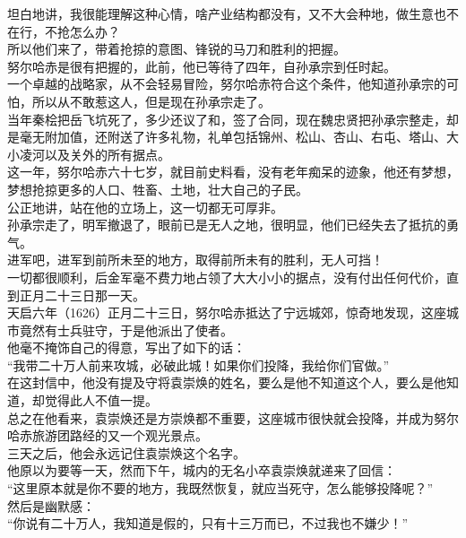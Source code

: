 \begin{multicols}{\theparacolNo}
坦白地讲，我很能理解这种心情，啥产业结构都没有，又不大会种地，做生意也不在行，不抢怎么办？\\

所以他们来了，带着抢掠的意图、锋锐的马刀和胜利的把握。\\

努尔哈赤是很有把握的，此前，他已等待了四年，自孙承宗到任时起。\\

一个卓越的战略家，从不会轻易冒险，努尔哈赤符合这个条件，他知道孙承宗的可怕，所以从不敢惹这人，但是现在孙承宗走了。\\

当年秦桧把岳飞坑死了，多少还议了和，签了合同，现在魏忠贤把孙承宗整走，却是毫无附加值，还附送了许多礼物，礼单包括锦州、松山、杏山、右屯、塔山、大小凌河以及关外的所有据点。\\

这一年，努尔哈赤六十七岁，就目前史料看，没有老年痴呆的迹象，他还有梦想，梦想抢掠更多的人口、牲畜、土地，壮大自己的子民。\\

公正地讲，站在他的立场上，这一切都无可厚非。\\

孙承宗走了，明军撤退了，眼前已是无人之地，很明显，他们已经失去了抵抗的勇气。\\

进军吧，进军到前所未至的地方，取得前所未有的胜利，无人可挡！\\

一切都很顺利，后金军毫不费力地占领了大大小小的据点，没有付出任何代价，直到正月二十三日那一天。\\

天启六年（1626）正月二十三日，努尔哈赤抵达了宁远城郊，惊奇地发现，这座城市竟然有士兵驻守，于是他派出了使者。\\

他毫不掩饰自己的得意，写出了如下的话：\\

“我带二十万人前来攻城，必破此城！如果你们投降，我给你们官做。”\\

在这封信中，他没有提及守将袁崇焕的姓名，要么是他不知道这个人，要么是他知道，却觉得此人不值一提。\\

总之在他看来，袁崇焕还是方崇焕都不重要，这座城市很快就会投降，并成为努尔哈赤旅游团路经的又一个观光景点。\\

三天之后，他会永远记住袁崇焕这个名字。\\

他原以为要等一天，然而下午，城内的无名小卒袁崇焕就递来了回信：\\

“这里原本就是你不要的地方，我既然恢复，就应当死守，怎么能够投降呢？”\\

然后是幽默感：\\

“你说有二十万人，我知道是假的，只有十三万而已，不过我也不嫌少！”\\

\ifnum{}
	\end{multicols}
\fi
\newpage
